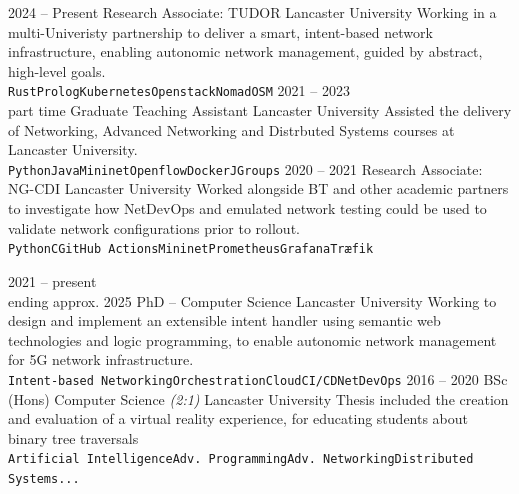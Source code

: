 \documentclass[9pt]{developercv} %
\begin{document}
\begin{entrylist}
	\entry
	{2024 -- Present}
	{Research Associate: TUDOR}
	{Lancaster University}
	{Working in a multi-Univeristy partnership to deliver a smart,
	intent-based network infrastructure, enabling autonomic network management,
	guided by abstract, high-level goals.\\
		\texttt{Rust}\slashsep\texttt{Prolog}\slashsep\texttt{Kubernetes}\slashsep\texttt{Openstack}\slashsep\texttt{Nomad}\slashsep\texttt{OSM}}
	\entry
	{2021 -- 2023\\\footnotesize{part time}}
	{Graduate Teaching Assistant}
	{Lancaster University}
	{Assisted the delivery of Networking, Advanced Networking and Distrbuted
	Systems courses at Lancaster University.\\
		\texttt{Python}\slashsep\texttt{Java}\slashsep\texttt{Mininet}\slashsep\texttt{Openflow}\slashsep\texttt{Docker}\slashsep\texttt{JGroups}}
	\entry
	{2020 -- 2021}
	{Research Associate: NG-CDI}
	{Lancaster University}
	{Worked alongside BT and other academic partners to investigate how
	NetDevOps and emulated network testing could be used to validate network configurations 
	prior to rollout.\\
		\texttt{Python}\slashsep\texttt{C}\slashsep\texttt{GitHub
		Actions}\slashsep\texttt{Mininet}\slashsep\texttt{Prometheus}\slashsep\texttt{Grafana}\slashsep\texttt{Træfik}}
\end{entrylist}


\vspace{-1em}

\begin{entrylist}
	\entry
	{2021 -- present\\\footnotesize{ending approx. 2025}}
	{PhD -- Computer Science}
	{Lancaster University}
	{Working to design and implement an extensible intent handler using semantic
	web technologies and logic programming, to enable autonomic network
	management for 5G network infrastructure.
	\\\texttt{Intent-based
	Networking}\slashsep\texttt{Orchestration}\slashsep\texttt{Cloud}\slashsep\texttt{CI/CD}\slashsep\texttt{NetDevOps}}
	\entry
	{2016 -- 2020}
	{BSc (Hons) Computer Science \textit{(2:1)}}
	{Lancaster University}
	{Thesis included the creation and evaluation of a virtual reality
	experience, for educating students about binary tree traversals
	\\\texttt{Artificial Intelligence}\slashsep\texttt{Adv.
			Programming}\slashsep\texttt{Adv. Networking}\slashsep\texttt{Distributed Systems}\slashsep\texttt{...}}
\end{entrylist}
\end{document}
